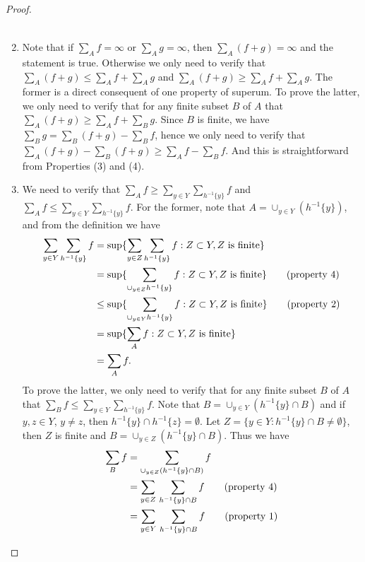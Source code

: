 \begin{proof}
\begin{enumerate}
\begin{align*}
  \end{align*}
\item Note that if $\sum_A f=\infty$ or $\sum_A g=\infty$, then 
  $\sum_A (f+g)=\infty$ and the statement is true. Otherwise we only need to 
  verify that $\sum_A (f+g) \leq \sum_A f + \sum_A g$ and
  $\sum_A (f+g) \geq \sum_A f + \sum_A g$. The former is a direct consequent of
  one property of superum. To prove the latter, we only need to verify that for
  any finite subset $B$ of $A$ that $\sum_A (f+g)\geq \sum_A f + \sum_B g$.
  Since $B$ is finite, we have $\sum_B g=\sum_B (f+g) -\sum_B f$, hence we only 
  need to verify that $\sum_A (f+g) - \sum_B (f+g) \geq \sum_A f -\sum_B f$.
  And this is straightforward from Properties (3) and (4).
\item We need to verify that
  $\sum_A f \geq \sum_{y\in Y} \sum_{h^{-1}\{y\}} f$ and
  $\sum_A f \leq \sum_{y\in Y} \sum_{h^{-1}\{y\}} f$. 
  For the former, note that $A=\cup_{y\in Y}(h^{-1}\{y\})$, and
  from the definition we have
  \begin{align*}
    \sum_{y\in Y} \sum_{h^{-1}\{y\}} f
      &= \sup\{ \sum_{y\in Z} \sum_{h^{-1}\{y\}} f
        : Z\subset Y, \text{$Z$ is finite} \}  \notag \\
      &= \sup\{ \sum_{\cup_{y\in Z} h^{-1}\{y\}} f
        : Z\subset Y, \text{$Z$ is finite} \} \qquad \text{(property 4)}
        \notag \\
      &\leq \sup\{ \sum_{\cup_{y\in Y} h^{-1}\{y\}} f
        : Z\subset Y, \text{$Z$ is finite} \} \qquad \text{(property 2)}
        \notag \\
      &= \sup\{ \sum_A f: Z\subset Y, \text{$Z$ is finite} \}  \notag \\
      &= \sum_A f.
  \end{align*}
  To prove the latter, we only need to verify that for any finite subset $B$ of
  $A$ that $\sum_B f \leq \sum_{y\in Y} \sum_{h^{-1}\{y\}} f$. Note that
  $B=\cup_{y\in Y}(h^{-1}\{y\} \cap B)$ and if $y,z\in Y$, $y\ne z$, then 
  $h^{-1}\{y\}\cap h^{-1}\{z\}=\emptyset$. 
  Let $Z=\{y\in Y: h^{-1}\{y\}\cap B\ne \emptyset\}$, then $Z$ is finite and
  $B=\cup_{y\in Z}(h^{-1}\{y\} \cap B)$.
  Thus we have
  \begin{align*}
    \sum_B f 
      &= \sum_{\cup_{y\in Z}(h^{-1}\{y\} \cap B)} f \notag \\
      &= \sum_{y\in Z}\, \sum_{h^{-1}\{y\}\cap B} f \qquad \text{(property 4)}
        \notag \\
      &= \sum_{y\in Y}\, \sum_{h^{-1}\{y\}\cap B} f \qquad \text{(property 1)} 

\end{align*}
\end{enumerate}
\end{proof}
